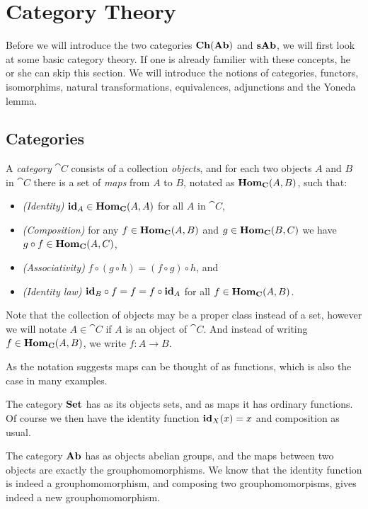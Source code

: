 \section{Category Theory}
\label{sec:Category Theory}
Before we will introduce the two categories $\mathbf{Ch}(\mathbf{Ab})$ and $\mathbf{sAb}$, we will first look at some basic category theory. If one is already familier with these concepts, he or she can skip this section. We will introduce the notions of categories, functors, isomorphims, natural transformations, equivalences, adjunctions and the Yoneda lemma.

\subsection{Categories}
\begin{definition}
	A \emph{category} $\cat{C}$ consists of a collection \emph{objects}, and for each two objects $A$ and $B$ in $\cat{C}$ there is a set of \emph{maps}  from $A$ to $B$, notated as $\mathbf{Hom}_{\mathbf{C}}(A, B)$, such that:
	\begin{itemize}
		\item \emph{(Identity)}
			$\mathbf{id}_A \in \mathbf{Hom}_{\mathbf{C}}(A, A)$ for all $A$ in $\cat{C}$,
		\item \emph{(Composition)}
			for any $f \in \mathbf{Hom}_{\mathbf{C}}(A, B)$ and $g \in \mathbf{Hom}_{\mathbf{C}}(B, C)$ we have $g \circ f \in \mathbf{Hom}_{\mathbf{C}}(A, C)$,
		\item \emph{(Associativity)}
			$f \circ (g \circ h) = (f \circ g) \circ h$, and
		\item \emph{(Identity law)}
			$\mathbf{id}_B \circ f = f = f \circ \mathbf{id}_A$ for all $f \in \mathbf{Hom}_{\mathbf{C}}(A, B)$.
	\end{itemize}
\end{definition}

Note that the collection of objects may be a proper class instead of a set, however we will notate $A \in \cat{C}$ if $A$ is an object of $\cat{C}$. And instead of writing $f \in \mathbf{Hom}_{\mathbf{C}}(A, B)$, we write $f: A \to B$.

As the notation suggests maps can be thought of as functions, which is also the case in many examples.

\begin{example}
	The category $\mathbf{Set}$ has as its objects sets, and as maps it has ordinary functions. Of course we then have the identity function $\mathbf{id}_X(x) = x$ and composition as usual.
\end{example}
\begin{example}
	The category $\mathbf{Ab}$ has as objects abelian groups, and the maps between two objects are exactly the grouphomomorphisms. We know that the identity function is indeed a grouphomomorphism, and composing two grouphomomorpisms, gives indeed a new grouphomomorphism.
\end{example}

